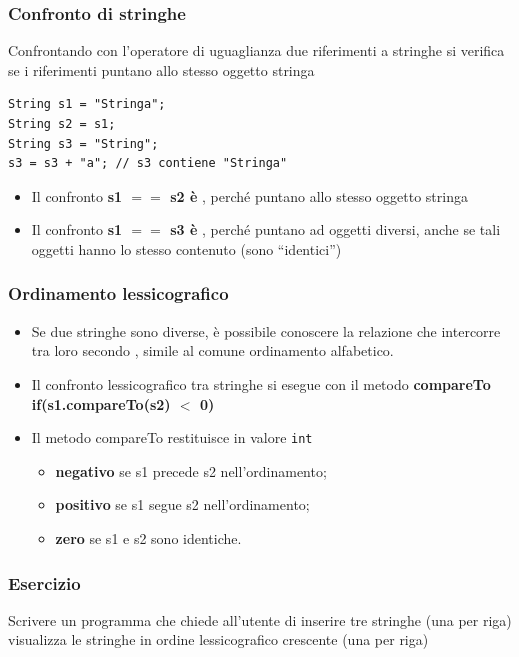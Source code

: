 \begin{frame}[fragile]
\frametitle{Confronto di stringhe}
\begin{block}{}
Confrontando con l'operatore di uguaglianza due riferimenti a stringhe si verifica se i riferimenti puntano allo stesso oggetto stringa
\end{block}
\begin{lstlisting}
String s1 = "Stringa";
String s2 = s1;
String s3 = "String";
s3 = s3 + "a"; // s3 contiene "Stringa"
\end{lstlisting}
\pause
\begin{block}{}
\begin{itemize}
\item Il confronto \textbf{s1 $==$ s2 è }, perché puntano allo stesso oggetto stringa
\item Il confronto \textbf{s1 $==$ s3 è }, perché puntano ad oggetti diversi, anche se tali oggetti hanno lo stesso contenuto 
(sono ``identici'')
\end{itemize}
\end{block}
\end{frame}
\begin{frame}
\frametitle{Ordinamento lessicografico}
\begin{block}{}
\begin{itemize}
\item Se due stringhe sono diverse, è possibile conoscere la relazione che intercorre tra loro secondo \textbf{}, simile al comune ordinamento alfabetico.
\item Il confronto lessicografico tra stringhe si esegue con il metodo \textbf{compareTo}\\
\hspace{0.7cm}\textbf{if(s1.\alert{compareTo}(s2) $<$ 0)}
\item Il metodo compareTo restituisce in valore \texttt{int}
\begin{itemize}
\item \textbf{negativo} se s1 precede s2 nell'ordinamento;
\item \textbf{positivo} se s1 segue s2 nell'ordinamento;
\item \textbf{zero} se s1 e s2 sono identiche.
\end{itemize}
\end{itemize}
\end{block}
\end{frame}

\begin{frame}
\frametitle{Esercizio}
\begin{block}{}
Scrivere un programma che chiede all'utente di inserire tre stringhe (una per riga) visualizza le stringhe in ordine lessicografico 
crescente (una per riga)
\end{block}
\end{frame}

